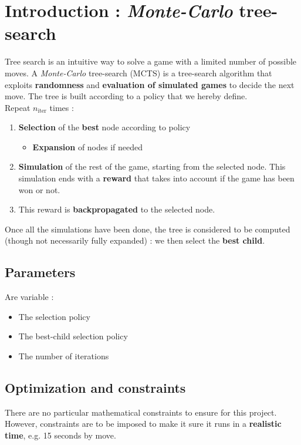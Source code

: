\documentclass[11pt,a4paper]{article}
\begin{document}
\newpage
\tableofcontents



\section{Introduction : \textit{Monte-Carlo} tree-search}
Tree search is an intuitive way to solve a game with a limited number of possible moves. A \textit{Monte-Carlo} tree-search (MCTS) is a tree-search algorithm that exploits \textbf{randomness} and \textbf{evaluation of simulated games} to decide the next move. The tree is built according to a policy that we hereby define.\\

Repeat $n_{\text{iter}}$ times :
\begin{enumerate}
    \item \textbf{Selection} of the \textbf{best} node according to policy
    \begin{itemize}[label=$\blacktriangleright$]
        \item \textbf{Expansion} of nodes if needed
    \end{itemize}
    \item \textbf{Simulation} of the rest of the game, starting from the selected node. This simulation ends with a \textbf{reward} that takes into account if the game has been won or not.
    \item This reward is \textbf{backpropagated} to the selected node.
\end{enumerate}
Once all the simulations have been done, the tree is considered to be computed (though not necessarily fully expanded) : we then select the \textbf{best child}.\\

\subsection{Parameters}
Are variable :
\begin{itemize}
    \item The selection policy
    \item The best-child selection policy
    \item The number of iterations
\end{itemize}

\subsection{Optimization and constraints}
There are no particular mathematical constraints to ensure for this project. However, constraints are to be imposed to make it sure it runs in a \textbf{realistic time}, e.g. 15 seconds by move. \\
\end{document}
